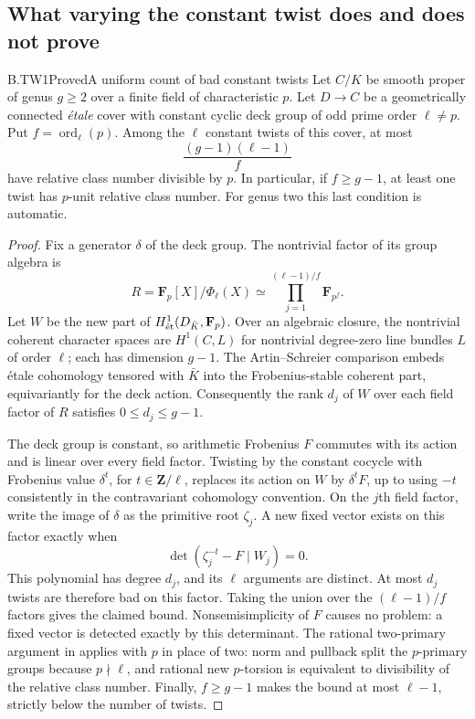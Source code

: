\subsection{What varying the constant twist does and does not prove}

\begin{claim}{B.TW1}{Proved}{A uniform count of bad constant twists}
Let $C/K$ be smooth proper of genus $g\ge2$ over a finite field
of characteristic $p$. Let $D\to C$ be a geometrically connected
\emph{\'etale} cover with constant cyclic deck group of odd prime
order $\ell\ne p$. Put $f=\operatorname{ord}_\ell(p)$.
Among the $\ell$ constant twists of this cover, at most
\[
                \frac{(g-1)(\ell-1)}{f}
\]
have relative class number divisible by $p$. In particular, if
$f\ge g-1$, at least one twist has $p$-unit relative class number.
For genus two this last condition is automatic.
\end{claim}
\begin{proof}
Fix a generator $\delta$ of the deck group. The nontrivial factor
of its group algebra is
\[
 R=\mathbf F_p[X]/\Phi_\ell(X)
       \simeq\prod_{j=1}^{(\ell-1)/f}\mathbf F_{p^f}.
\]
Let $W$ be the new part of
$H^1_{\et}(D_{\bar K},\mathbf F_p)$. Over an algebraic closure,
the nontrivial coherent character spaces are $H^1(C,L)$ for
nontrivial degree-zero line bundles $L$ of order $\ell$; each
has dimension $g-1$. The Artin--Schreier comparison embeds
\'etale cohomology tensored with $\bar K$ into the Frobenius-stable
coherent part, equivariantly for the deck action. Consequently the rank $d_j$ of $W$ over each field
factor of $R$ satisfies $0\le d_j\le g-1$.

The deck group is constant, so arithmetic Frobenius $F$ commutes
with its action and is linear over every field factor. Twisting
by the constant cocycle with Frobenius value $\delta^t$, for
$t\in\mathbf Z/\ell$, replaces its action on $W$ by
$\delta^tF$, up to using $-t$ consistently in the contravariant
cohomology convention. On the $j$th field factor, write the image
of $\delta$ as the primitive root $\zeta_j$. A new fixed vector
exists on this factor exactly when
\[
               \det(\zeta_j^{-t}-F\mid W_j)=0.
\]
This polynomial has degree $d_j$, and its $\ell$ arguments are
distinct. At most $d_j$ twists are therefore bad on this factor.
Taking the union over the $(\ell-1)/f$ factors gives the claimed
bound. Nonsemisimplicity of $F$ causes no problem: a fixed vector
is detected exactly by this determinant. The rational two-primary
argument in  applies with $p$ in place of two:
norm and pullback split the $p$-primary groups because
$p\nmid\ell$, and rational new $p$-torsion is equivalent to
divisibility of the relative class number. Finally,
$f\ge g-1$ makes the bound at most $\ell-1$, strictly below the
number of twists.
\end{proof}

